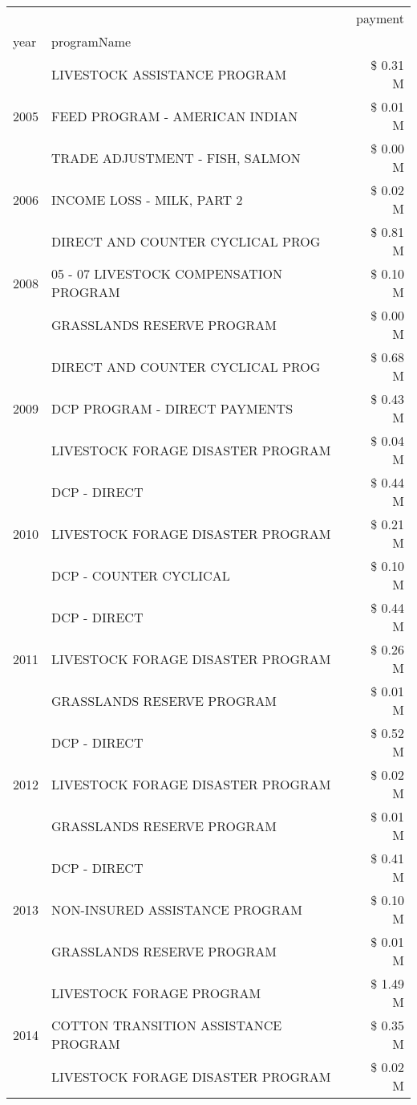\begin{tabular}{llr}
\toprule
 &  & payment \\
year & programName &  \\
\midrule
\multirow[t]{3}{*}{2005} & LIVESTOCK ASSISTANCE PROGRAM & \$ 0.31 M \\
 & FEED PROGRAM - AMERICAN INDIAN & \$ 0.01 M \\
 & TRADE ADJUSTMENT - FISH, SALMON & \$ 0.00 M \\
\cline{1-3}
2006 & INCOME LOSS - MILK, PART 2 & \$ 0.02 M \\
\cline{1-3}
\multirow[t]{3}{*}{2008} & DIRECT AND COUNTER CYCLICAL PROG & \$ 0.81 M \\
 & 05 - 07 LIVESTOCK COMPENSATION PROGRAM & \$ 0.10 M \\
 & GRASSLANDS RESERVE PROGRAM & \$ 0.00 M \\
\cline{1-3}
\multirow[t]{3}{*}{2009} & DIRECT AND COUNTER CYCLICAL PROG & \$ 0.68 M \\
 & DCP PROGRAM - DIRECT PAYMENTS & \$ 0.43 M \\
 & LIVESTOCK FORAGE DISASTER  PROGRAM & \$ 0.04 M \\
\cline{1-3}
\multirow[t]{3}{*}{2010} & DCP - DIRECT & \$ 0.44 M \\
 & LIVESTOCK FORAGE DISASTER PROGRAM & \$ 0.21 M \\
 & DCP - COUNTER CYCLICAL & \$ 0.10 M \\
\cline{1-3}
\multirow[t]{3}{*}{2011} & DCP - DIRECT & \$ 0.44 M \\
 & LIVESTOCK FORAGE DISASTER PROGRAM & \$ 0.26 M \\
 & GRASSLANDS RESERVE PROGRAM & \$ 0.01 M \\
\cline{1-3}
\multirow[t]{3}{*}{2012} & DCP - DIRECT & \$ 0.52 M \\
 & LIVESTOCK FORAGE DISASTER PROGRAM & \$ 0.02 M \\
 & GRASSLANDS RESERVE PROGRAM & \$ 0.01 M \\
\cline{1-3}
\multirow[t]{3}{*}{2013} & DCP - DIRECT & \$ 0.41 M \\
 & NON-INSURED ASSISTANCE PROGRAM & \$ 0.10 M \\
 & GRASSLANDS RESERVE PROGRAM & \$ 0.01 M \\
\cline{1-3}
\multirow[t]{3}{*}{2014} & LIVESTOCK FORAGE PROGRAM & \$ 1.49 M \\
 & COTTON TRANSITION ASSISTANCE PROGRAM & \$ 0.35 M \\
 & LIVESTOCK FORAGE DISASTER PROGRAM & \$ 0.02 M \\

\end{tabular}
